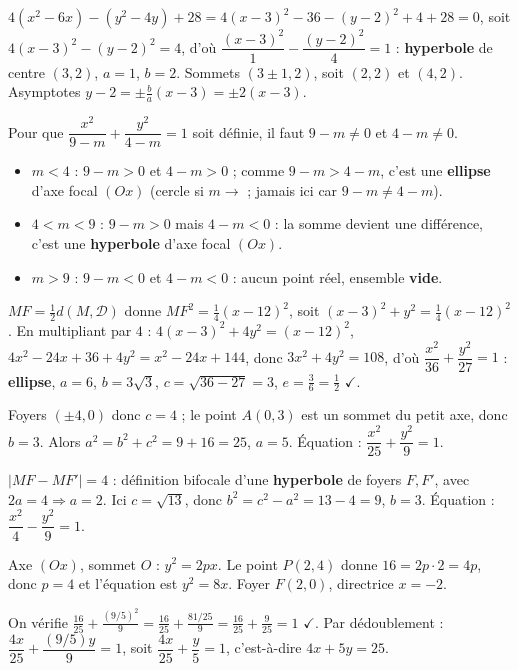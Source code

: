 $4(x^{2}-6x)-(y^{2}-4y)+28=4(x-3)^{2}-36-(y-2)^{2}+4+28=0$, soit
$4(x-3)^{2}-(y-2)^{2}=4$, d'où $\dfrac{(x-3)^{2}}{1}-\dfrac{(y-2)^{2}}{4}=1$ :
\textbf{hyperbole} de centre $(3,2)$, $a=1$, $b=2$. Sommets $(3\pm1,2)$, soit $(2,2)$ et
$(4,2)$. Asymptotes $y-2=\pm\tfrac ba(x-3)=\pm2(x-3)$.

Pour que $\dfrac{x^{2}}{9-m}+\dfrac{y^{2}}{4-m}=1$ soit définie, il faut $9-m\ne0$ et
$4-m\ne0$.
\begin{itemize}
\item $m<4$ : $9-m>0$ et $4-m>0$ ; comme $9-m>4-m$, c'est une \textbf{ellipse} d'axe focal
$(Ox)$ (cercle si $m\to$ ; jamais ici car $9-m\ne4-m$).
\item $4<m<9$ : $9-m>0$ mais $4-m<0$ : la somme devient une différence, c'est une
\textbf{hyperbole} d'axe focal $(Ox)$.
\item $m>9$ : $9-m<0$ et $4-m<0$ : aucun point réel, ensemble \textbf{vide}.
\end{itemize}

$MF=\tfrac12 d(M,\mathcal D)$ donne $MF^{2}=\tfrac14(x-12)^{2}$, soit
$(x-3)^{2}+y^{2}=\tfrac14(x-12)^{2}$. En multipliant par $4$ :
$4(x-3)^{2}+4y^{2}=(x-12)^{2}$, $4x^{2}-24x+36+4y^{2}=x^{2}-24x+144$,
donc $3x^{2}+4y^{2}=108$, d'où $\dfrac{x^{2}}{36}+\dfrac{y^{2}}{27}=1$ :
\textbf{ellipse}, $a=6$, $b=3\sqrt3$, $c=\sqrt{36-27}=3$, $e=\tfrac36=\tfrac12$ $\checkmark$.

Foyers $(\pm4,0)$ donc $c=4$ ; le point $A(0,3)$ est un sommet du petit axe, donc $b=3$.
Alors $a^{2}=b^{2}+c^{2}=9+16=25$, $a=5$. Équation :
$\dfrac{x^{2}}{25}+\dfrac{y^{2}}{9}=1$.

$|MF-MF'|=4$ : définition bifocale d'une \textbf{hyperbole} de foyers $F,F'$, avec
$2a=4\Rightarrow a=2$. Ici $c=\sqrt{13}$, donc $b^{2}=c^{2}-a^{2}=13-4=9$, $b=3$.
Équation : $\dfrac{x^{2}}{4}-\dfrac{y^{2}}{9}=1$.

Axe $(Ox)$, sommet $O$ : $y^{2}=2px$. Le point $P(2,4)$ donne $16=2p\cdot2=4p$, donc
$p=4$ et l'équation est $y^{2}=8x$. Foyer $F(2,0)$, directrice $x=-2$.

On vérifie $\tfrac{16}{25}+\tfrac{(9/5)^{2}}{9}=\tfrac{16}{25}+\tfrac{81/25}{9}
=\tfrac{16}{25}+\tfrac{9}{25}=1$ $\checkmark$. Par dédoublement :
$\dfrac{4x}{25}+\dfrac{(9/5)y}{9}=1$, soit $\dfrac{4x}{25}+\dfrac{y}{5}=1$, c'est-à-dire
$4x+5y=25$.

